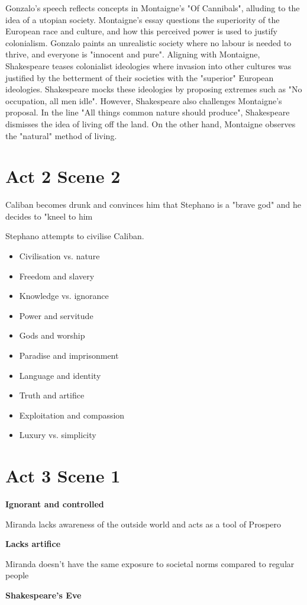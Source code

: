 	Gonzalo's speech reflects concepts in Montaigne's "Of Cannibals", alluding to the idea of a utopian society. Montaigne's essay questions the superiority of the European race and culture, and how this perceived power is used to justify colonialism. Gonzalo paints an unrealistic society where no labour is needed to thrive, and everyone is "innocent and pure". Aligning with Montaigne, Shakespeare teases colonialist ideologies where invasion into other cultures was justified by the betterment of their societies with the "superior" European ideologies. Shakespeare mocks these ideologies by proposing extremes such as "No occupation, all men idle". However, Shakespeare also challenges Montaigne's proposal. In the line "All things common nature should produce", Shakespeare dismisses the idea of living off the land. On the other hand, Montaigne observes the "natural" method of living.

\section{Act 2 Scene 2} \label{25/02/2025}

	Caliban becomes drunk and convinces him that Stephano is a "brave god" and he decides to "kneel to him

	Stephano attempts to civilise Caliban.

	\begin{itemize}
		\item Civilisation vs. nature
		\item Freedom and slavery
		\item Knowledge vs. ignorance
		\item Power and servitude
		\item Gods and worship
		\item Paradise and imprisonment
		\item Language and identity
		\item Truth and artifice
		\item Exploitation and compassion
		\item Luxury vs. simplicity
	\end{itemize}

\section{Act 3 Scene 1} \label{26/02/2025}

	\textbf{Ignorant and controlled}

		Miranda lacks awareness of the outside world and acts as a tool of Prospero

	\textbf{Lacks artifice}

		Miranda doesn't have the same exposure to societal norms compared to regular people

	\textbf{Shakespeare's Eve}

	
